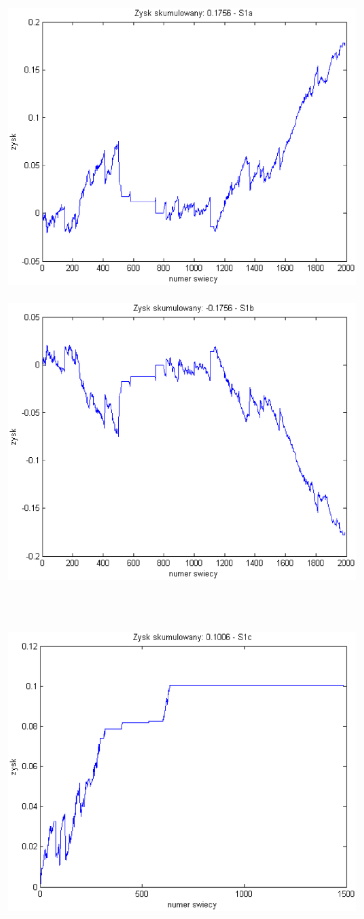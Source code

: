 \documentclass{tewiart}
\begin{document}
\begin{figure}[h]
\centering
\begin{minipage}{.49\linewidth}
\centering
\includegraphics[width=0.82\textwidth]{images/cadchfS1a.eps}
\label{jedno}
\end{minipage}
\begin{minipage}{.49\linewidth}
\centering
\includegraphics[width=0.82\textwidth]{images/cadchfS1b.eps}
\label{dwu}
\end{minipage}
\\
\begin{minipage}{.49\linewidth}
\centering
\includegraphics[width=0.82\textwidth]{images/cadchfS1c.eps}

\end{minipage}
\end{figure}
\end{document}
